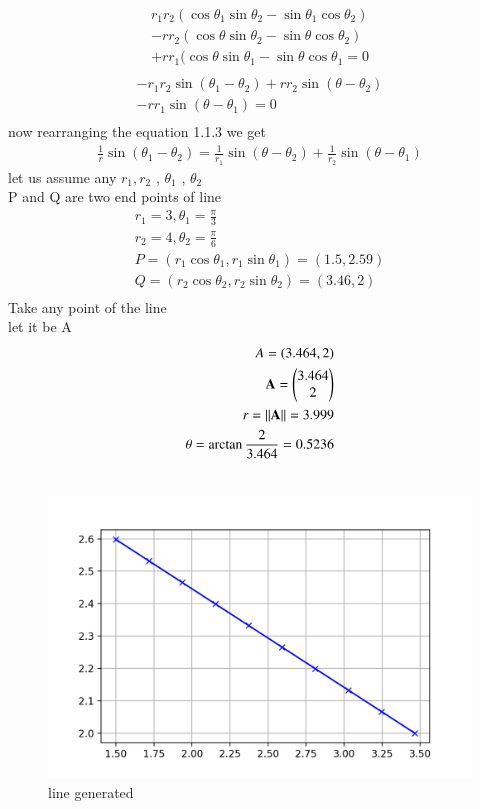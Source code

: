 \documentclass[journal,12pt,twocolumn]{IEEEtran}
\renewcommand\thesection{\arabic{section}}
\begin{document}
\begin{enumerate}[label=\thesection.\arabic*.,ref=\thesection.\theenumi]
\begin{align}\nonumber
 r_1r_2(\cos\theta_1\sin\theta_2-\sin\theta_1\cos\theta_2)\\\nonumber
 -rr_2(\cos\theta\sin\theta_2-\sin\theta\cos\theta_2)\\\nonumber
 +rr_1(\cos\theta\sin\theta_1-\sin\theta\cos\theta_1=0\\
\end{align}
\begin{align}\nonumber
-r_1r_2\sin(\theta_1-\theta_2)+rr_2\sin(\theta-\theta_2)\\\nonumber
-rr_1\sin(\theta-\theta_1)=0\\
\end{align}
now rearranging the equation 1.1.3 we get 
\begin{align}
\frac{1}{r} \sin{(\theta_1-\theta_2)}=\frac{1}{r_1} \sin{(\theta-\theta_2)}+\frac{1}{r_2} \sin{(\theta-\theta_1)}
 \end{align}
 let us assume  any   $r_1 , r_2$ , $\theta_1$ , $\theta_2$\\
 P and Q are two end points of line
 \begin{align}
     r_1=3  ,\theta_1=\frac{\pi}{3}\\
     r_2=4  ,\theta_2=\frac{\pi}{6}\\
     P=(r_1\cos\theta_1,r_1\sin\theta_1)=(1.5,2.59)\\
     Q=(r_2\cos\theta_2,r_2\sin\theta_2)=(3.46,2)\\\nonumber
 \end{align}
 Take any point of the line \\
 let it be A\\
\begin{align}
A=(3.464,2)\\
\mathbf{A}=\begin{pmatrix}3.464\\2\end{pmatrix}\\
r=\lVert\mathbf{A}\rVert=3.999\\
\theta=\arctan\frac{2}{3.464}=0.5236\\\nonumber
\end{align}

 
 \begin{figure}[!ht]
	\centering
	\includegraphics[width=\columnwidth]{line.png}
	\caption{line generated}
	\label{fig:line}
\end{figure}

\end{enumerate}
\end{document}
